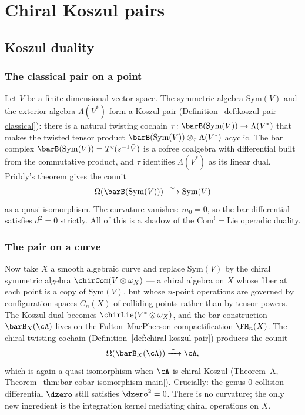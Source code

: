 
\chapter{Chiral Koszul pairs}


\section{Koszul duality}

\subsection{The classical pair on a point}

Let $V$ be a finite-dimensional vector space.  The symmetric algebra $\mathrm{Sym}(V)$ and the exterior algebra $\Lambda(V^*)$ form a Koszul pair
(Definition~\ref{def:koszul-pair-classical}): there is a natural twisting cochain
$\tau\colon \barB(\mathrm{Sym}(V)) \to \Lambda(V^*)$ that makes the
twisted tensor product $\barB(\mathrm{Sym}(V)) \otimes_\tau \Lambda(V^*)$ acyclic.  The bar complex $\barB(\mathrm{Sym}(V)) = T^c(s^{-1}\bar{V})$ is a cofree
coalgebra with differential built from the commutative product, and
$\tau$ identifies $\Lambda(V^*)$ as its linear dual.  Priddy's theorem \cite{Priddy70} gives the counit
\[
  \Omega(\barB(\mathrm{Sym}(V))) \xrightarrow{\;\sim\;} \mathrm{Sym}(V)
\]
as a quasi-isomorphism.  The curvature vanishes: $m_0 = 0$, so the bar
differential satisfies $d^2 = 0$ strictly.  All of this is a
shadow of the $\mathrm{Com}^! = \mathrm{Lie}$ operadic duality.

\subsection{The pair on a curve}

Now take $X$ a smooth algebraic curve and replace
$\mathrm{Sym}(V)$ by the chiral symmetric algebra
$\chirCom(V \otimes \omega_X)$ --- a chiral algebra on $X$ whose fiber
at each point is a copy of $\mathrm{Sym}(V)$, but whose
$n$-point operations are governed by configuration spaces
$\overline{C}_n(X)$ of colliding points rather than by tensor powers.
The Koszul dual becomes $\chirLie(V^* \otimes \omega_X)$, and the bar
construction $\barB_X(\cA)$ lives on the Fulton--MacPherson
compactification $\FM_n(X)$.  The chiral twisting cochain
(Definition~\ref{def:chiral-koszul-pair}) produces the counit
\[
  \Omega(\barB_X(\cA)) \xrightarrow{\;\sim\;} \cA,
\]
which is again a quasi-isomorphism when $\cA$ is chiral Koszul
(Theorem~A, Theorem~\ref{thm:bar-cobar-isomorphism-main}).  Crucially:
the genus-$0$ collision differential $\dzero$ still satisfies
$\dzero^2 = 0$.  There is no curvature; the only new ingredient is
the integration kernel mediating chiral operations on $X$.

